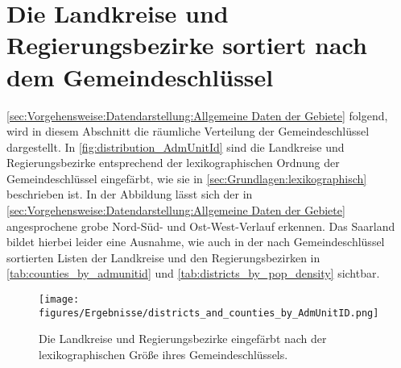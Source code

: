 \newpage
\section{Die Landkreise und Regierungsbezirke sortiert nach dem Gemeindeschlüssel}
\autoref{sec:Vorgehensweise:Datendarstellung:Allgemeine Daten der Gebiete} folgend, wird in diesem Abschnitt die räumliche Verteilung der Gemeindeschlüssel dargestellt.
In \autoref{fig:distribution_AdmUnitId} sind die Landkreise und Regierungsbezirke entsprechend der lexikographischen Ordnung der Gemeindeschlüssel eingefärbt, wie sie in  \autoref{sec:Grundlagen:lexikographisch} beschrieben ist. In der Abbildung lässt sich der in \autoref{sec:Vorgehensweise:Datendarstellung:Allgemeine Daten der Gebiete} angesprochene grobe Nord-Süd- und Ost-West-Verlauf erkennen. Das Saarland bildet hierbei leider eine Ausnahme, wie auch in der nach Gemeindeschlüssel sortierten Listen der Landkreise und den Regierungsbezirken in \autoref{tab:counties_by_admunitid} und \autoref{tab:districts_by_pop_density} sichtbar.
\begin{figure}[H]
    \centering
    \texttt{[image: figures/Ergebnisse/districts\_and\_counties\_by\_AdmUnitID.png]}
    \caption{Die Landkreise und Regierungsbezirke eingefärbt nach der lexikographischen Größe ihres Gemeindeschlüssels.}
    \label{fig:distribution_AdmUnitId}
\end{figure}